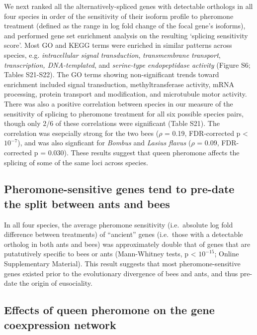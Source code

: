 \documentclass[12pt,]{article}
\begin{document}
We next ranked all the alternatively-spliced genes with detectable
orthologs in all four species in order of the sensitivity of their
isoform profile to pheromone treatment (defined as the range in log fold
change of the focal gene's isoforms), and performed gene set enrichment
analysis on the resulting `splicing sensitivity score'. Most GO and KEGG
terms were enriched in similar patterns across species, e.g.
\emph{intracellular signal transduction}, \emph{transmembrane
transport}, \emph{transcription, DNA-templated}, and \emph{serine-type
endopeptidase activity} (Figure S6; Tables S21-S22). The GO terms
showing non-significant trends toward enrichment included signal
transduction, methyltransferase activity, mRNA processing, protein
transport and modification, and microtubule motor activity. There was
also a positive correlation between species in our measure of the
sensitivity of splicing to pheromone treatment for all six possible
species pairs, though only 2/6 of these correlations were significant
(Table S21). The correlation was esepcially strong for the two bees
(\(\rho\) = 0.19, FDR-corrected p \textless{} \(10^{-7}\)), and was also
signficant for \emph{Bombus} and \emph{Lasius flavus} (\(\rho\) = 0.09,
FDR-corrected p = 0.030). These results suggest that queen pheromone
affects the splicing of some of the same loci across species.

\subsection{Pheromone-sensitive genes tend to pre-date the split between
ants and
bees}\label{pheromone-sensitive-genes-tend-to-pre-date-the-split-between-ants-and-bees}

In all four species, the average pheromone sensitivity (i.e.~absolute
log fold difference between treatments) of ``ancient'' genes (i.e.~those
with a detectable ortholog in both ants and bees) was approximately
double that of genes that are putatutively specific to bees or ants
(Mann-Whitney tests, p \textless{} \(10^{-15}\); Online Supplementary
Material). This result suggests that most pheromone-sensitive genes
existed prior to the evolutionary divergence of bees and ants, and thus
pre-date the origin of eusociality.

\subsection{Effects of queen pheromone on the gene coexpression
network}\label{effects-of-queen-pheromone-on-the-gene-coexpression-network}
\end{document}
